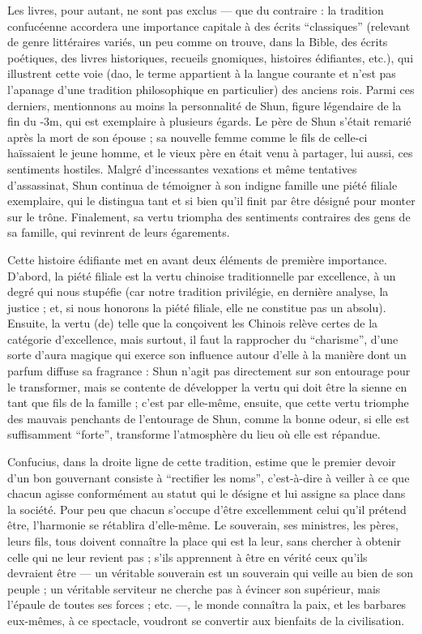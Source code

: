 Les livres, pour autant, ne sont pas exclus --- que du contraire : la tradition confucéenne
accordera une importance capitale à des écrits ``classiques'' (relevant de genre littéraires
variés, un peu comme on trouve, dans la Bible, des écrits poétiques, des livres historiques,
recueils gnomiques, histoires édifiantes, etc.), qui illustrent cette voie (dao, le terme
appartient à la langue courante et n'est pas l'apanage d'une tradition philosophique en
particulier) des anciens rois.
Parmi ces derniers, mentionnons au moins la personnalité de
Shun, figure légendaire de la fin du -3m, qui est exemplaire à plusieurs
égards.
Le père de Shun s'était remarié après la mort de son épouse ; sa nouvelle femme
comme le fils de celle-ci haïssaient le jeune homme, et le vieux père en était venu à
partager, lui aussi, ces sentiments hostiles.
Malgré d'incessantes vexations et même tentatives
d'assassinat, Shun continua de témoigner à son indigne famille une piété filiale
exemplaire, qui le distingua tant et si bien qu'il finit par être désigné pour monter sur le
trône.
Finalement, sa vertu triompha des sentiments contraires des gens de sa famille, qui
revinrent de leurs égarements.

Cette histoire édifiante met en avant deux éléments de première importance.
D'abord, la
piété filiale est la vertu chinoise traditionnelle par excellence, à un degré qui nous stupéfie
(car notre tradition privilégie, en dernière analyse, la justice ; et, si nous honorons la piété
filiale, elle ne constitue pas un absolu).
Ensuite, la vertu (de) telle que la conçoivent les
Chinois relève certes de la catégorie d'excellence, mais surtout, il faut la rapprocher du
``charisme'', d'une sorte d'aura magique qui exerce son influence autour d'elle à la manière
dont un parfum diffuse sa fragrance : Shun n'agit pas directement sur son entourage
pour le transformer, mais se contente de développer la vertu qui doit être la sienne en tant
que fils de la famille ; c'est par elle-même, ensuite, que cette vertu triomphe des mauvais
penchants de l'entourage de Shun, comme la bonne odeur, si elle est suffisamment
``forte'', transforme l'atmosphère du lieu où elle est répandue.

Confucius, dans la droite ligne de cette tradition, estime que le premier devoir d'un bon
gouvernant consiste à ``rectifier les noms'', c'est-à-dire à veiller à ce que
chacun agisse conformément au statut qui le désigne et lui assigne sa place dans la société.
Pour peu que chacun s'occupe d'être excellemment celui qu'il prétend être, l'harmonie
se rétablira d'elle-même.
Le souverain, ses ministres, les pères, leurs fils, tous doivent
connaître la place qui est la leur, sans chercher à obtenir celle qui ne leur revient pas ; s'ils
apprennent à être en vérité ceux qu'ils devraient être --- un véritable souverain est un souverain
qui veille au bien de son peuple ; un véritable serviteur ne cherche pas à évincer
son supérieur, mais l'épaule de toutes ses forces ; etc. ---, le monde connaîtra la paix, et les
barbares eux-mêmes, à ce spectacle, voudront se convertir aux bienfaits de la civilisation.

